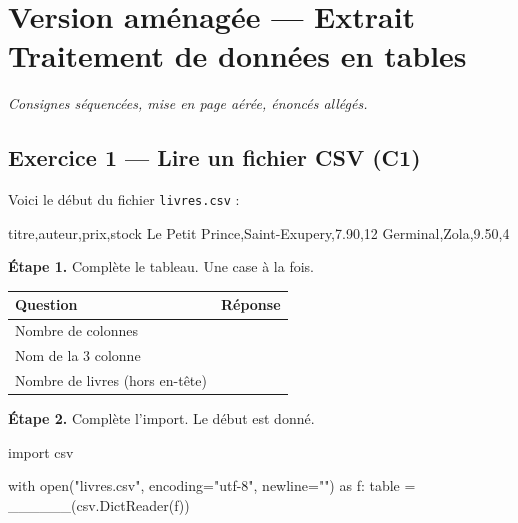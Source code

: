 \section*{Version aménagée --- Extrait Traitement de données en tables}
\textit{Consignes séquencées, mise en page aérée, énoncés allégés.}

\bigskip

\subsection*{Exercice 1 --- Lire un fichier CSV (C1)}

Voici le début du fichier \texttt{livres.csv} :

\begin{console}
titre,auteur,prix,stock
Le Petit Prince,Saint-Exupery,7.90,12
Germinal,Zola,9.50,4
\end{console}

\bigskip

\textbf{Étape 1.} Complète le tableau. Une case à la fois.

\bigskip

\begin{center}
\begin{tabular}{|l|c|}
\hline
\textbf{Question} & \textbf{Réponse} \\
\hline
Nombre de colonnes & \dotfill \\
\hline
Nom de la 3\ieme{} colonne & \dotfill \\
\hline
Nombre de livres (hors en-tête) & \dotfill \\
\hline
\end{tabular}
\end{center}

\bigskip

\textbf{Étape 2.} Complète l'import. Le début est donné.

\begin{python}
import csv

with open("livres.csv", encoding="utf-8", newline="") as f:
    table = ______(csv.DictReader(f))
\end{python}

